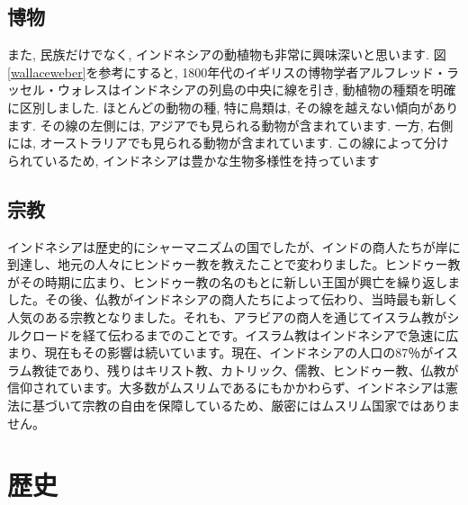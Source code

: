 \documentclass[a4j, twocolumn]{jarticle}
\begin{document}
  \subsection{博物}
  また, 民族だけでなく, インドネシアの動植物も非常に興味深いと思います. 図\ref{wallaceweber}を参考にすると, 1800年代のイギリスの博物学者アルフレッド・ラッセル・ウォレスはインドネシアの列島の中央に線を引き, 動植物の種類を明確に区別しました. ほとんどの動物の種, 特に鳥類は, その線を越えない傾向があります. その線の左側には, アジアでも見られる動物が含まれています. 一方, 右側には, オーストラリアでも見られる動物が含まれています. この線によって分けられているため, インドネシアは豊かな生物多様性を持っています\cite{wallaceline}
  \subsection{宗教}
  インドネシアは歴史的にシャーマニズムの国でしたが、インドの商人たちが岸に到達し、地元の人々にヒンドゥー教を教えたことで変わりました。ヒンドゥー教がその時期に広まり、ヒンドゥー教の名のもとに新しい王国が興亡を繰り返しました。その後、仏教がインドネシアの商人たちによって伝わり、当時最も新しく人気のある宗教となりました。それも、アラビアの商人を通じてイスラム教がシルクロードを経て伝わるまでのことです。イスラム教はインドネシアで急速に広まり、現在もその影響は続いています。現在、インドネシアの人口の87％がイスラム教徒であり、残りはキリスト教、カトリック、儒教、ヒンドゥー教、仏教が信仰されています。大多数がムスリムであるにもかかわらず、インドネシアは憲法に基づいて宗教の自由を保障しているため、厳密にはムスリム国家ではありません。
  \section{歴史}


  
  
\end{document}
